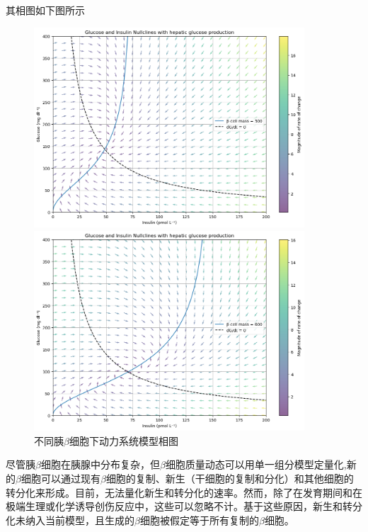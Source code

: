 其相图如下图所示
\begin{figure}[H]
    \begin{minipage}[t]{0.5\textwidth}
        \centering
        \includegraphics[width=0.9\textwidth]{Img/phase_300.png}
    \end{minipage}
    \begin{minipage}[t]{0.5\textwidth}
        \centering
        \includegraphics[width=0.9\textwidth]{Img/phase_600.png}
    \end{minipage}
    \caption{不同胰\(\beta\)细胞下动力系统模型相图}
    \label{fig:phase}
\end{figure}

尽管胰$\beta$细胞在胰腺中分布复杂，但$\beta$细胞质量动态可以用单一组分模型定量化,新的$\beta$细胞可以通过现有$\beta$细胞的复制、新生（干细胞的复制和分化）和其他细胞的转分化来形成。目前，无法量化新生和转分化的速率。然而，除了在发育期间和在极端生理或化学诱导创伤反应中，这些可以忽略不计\cite{finegood1995dynamics}。基于这些原因，新生和转分化未纳入当前模型，且生成的$\beta$细胞被假定等于所有复制的$\beta$细胞。

